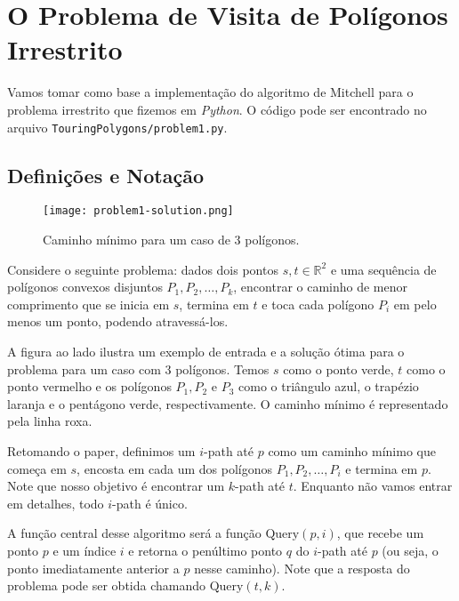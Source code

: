 \documentclass{article}
\begin{document}
\section{O Problema de Visita de Polígonos Irrestrito}

Vamos tomar como base a implementação do algoritmo de Mitchell para o problema irrestrito que fizemos em \textit{Python}. O código pode ser encontrado no arquivo \texttt{TouringPolygons/problem1.py}.

\subsection{Definições e Notação}

\begin{wrapfigure}{r}{0.40\textwidth}
	\centering
	\vspace{-10pt}
	\texttt{[image: problem1-solution.png]}
	\caption{Caminho mínimo para um caso de 3 polígonos.}
\end{wrapfigure}

Considere o seguinte problema: dados dois pontos \(s, t \in \mathbb{R}^2\) e uma sequência de polígonos convexos disjuntos \(P_1, P_2, \ldots, P_k\), encontrar o caminho de menor comprimento que se inicia em \(s\), termina em \(t\) e toca cada polígono \(P_i\) em pelo menos um ponto, podendo atravessá-los.

A figura ao lado ilustra um exemplo de entrada e a solução ótima para o problema para um caso com 3 polígonos. Temos \(s\) 
como o \textcolor[RGB]{0,128,0}{ponto verde}, \(t\) como o \textcolor[RGB]{255, 0, 0}{ponto vermelho} e os polígonos \(P_1, P_2\) e \(P_3\) como o \textcolor[RGB]{76, 146, 195}{triângulo azul}, o \textcolor[RGB]{255, 152, 62}{trapézio laranja} e o \textcolor[RGB]{86, 179, 86}{pentágono verde}, respectivamente. O caminho mínimo é representado pela \textcolor[RGB]{145, 41, 145}{linha roxa}.

Retomando o paper, definimos um \(i\)-path até \(p\) como um caminho mínimo que começa em \(s\), encosta em cada um dos polígonos \(P_1, P_2, \ldots, P_i\) e termina em \(p\). Note que nosso objetivo é encontrar um \(k\)-path até \(t\). Enquanto não vamos entrar em detalhes, todo \(i\)-path é único.

A função central desse algoritmo será a função \(\text{Query}(p, i)\), que recebe um ponto \(p\) e um índice \(i\) e retorna o penúltimo ponto \(q\) do \(i\)-path até \(p\) (ou seja, o ponto imediatamente anterior a \(p\) nesse caminho). Note que a resposta do problema pode ser obtida chamando \(\text{Query}(t, k)\).
\end{document}
